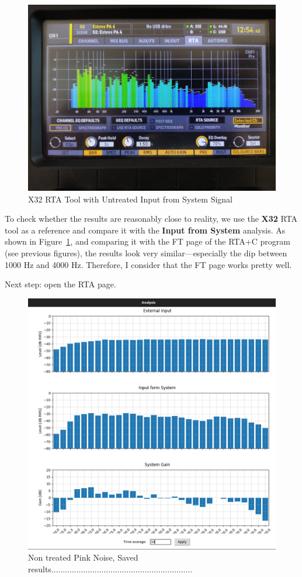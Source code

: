 \begin{figure}[H]
	\centering
	\includegraphics[width=0.6
	\linewidth]{Figures/Coro_X32_nontreated.jpeg}
	\caption{X32 RTA Tool with Untreated Input from System Signal}
	\label{fig:Coro_X32_nontreated}
\end{figure}

To check whether the results are reasonably close to reality, we use the \textbf{X32} RTA tool as a reference and compare it with the \textbf{Input from System} analysis. As shown in Figure~\ref{fig:Coro_X32_nontreated}, and comparing it with the FT page of the RTA+C program (see previous figures), the results look very similar—especially the dip between 1000 Hz and 4000 Hz. Therefore, I consider that the FT page works pretty well.

Next step: open the RTA page.

\begin{figure}[H]
	\centering
	\includegraphics[width=0.6
	\linewidth]{Figures/Coro_RTA_Saved.png}
	\caption{Non treated Pink Noise, Saved results..............................................................}
	\label{fig:Coro_RTA_saved}
\end{figure}

